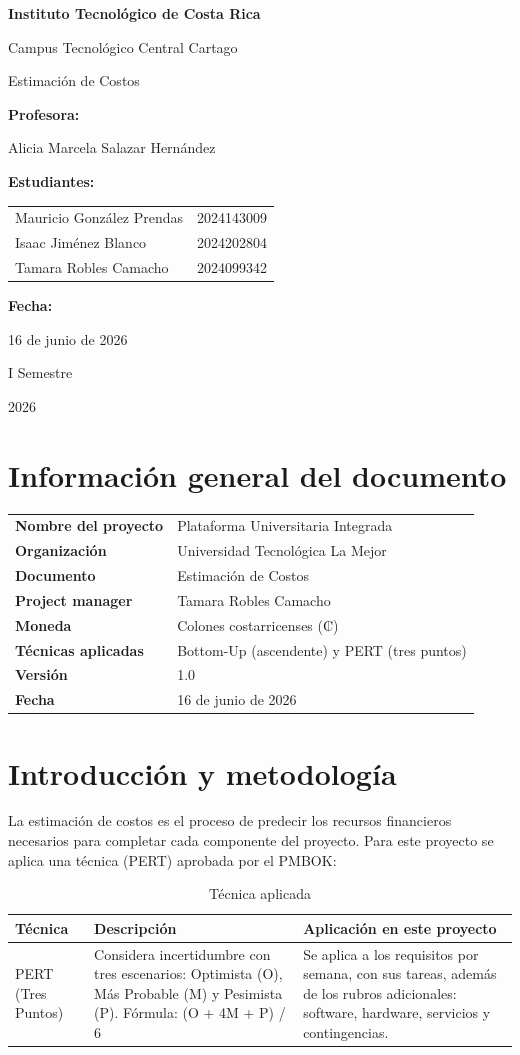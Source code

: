 \documentclass[11pt,spanish]{article}
\title{\DocumentoTitulo}
\author{\AutoresPortada}
\date{\FechaDocumento}
\makeatletter
\newcommand{\Institucion}{Instituto Tecnológico de Costa Rica}
\newcommand{\Campus}{Campus Tecnológico Central Cartago}
\newcommand{\DocumentoTitulo}{Estimación de Costos}
\newcommand{\Profesor}{Alicia Marcela Salazar Hernández}
\newcommand{\FechaDocumento}{16 de junio de 2026}
\newcommand{\PeriodoAcademico}{I Semestre}
\newcommand{\AnioDocumento}{2026}
\newcommand{\AutoresPortada}{%
    \begin{tabular}{l@{\hspace{1.5cm}}r}
        Mauricio González Prendas & 2024143009\\
        Isaac Jiménez Blanco & 2024202804\\
        Tamara Robles Camacho & 2024099342
    \end{tabular}%
}
\newcommand{\MakeCover}{%
\begin{titlepage}
\thispagestyle{empty}
\centering

{\bfseries \huge \Institucion \par}
\vspace{0.25cm}
{\LARGE \Campus \par}

\vfill

{\huge \DocumentoTitulo \par}

\vfill

{\bfseries \LARGE Profesora: \par}
{\Large \Profesor \par}

\vfill

{\bfseries \LARGE Estudiantes: \par}
{\Large \AutoresPortada \par}

\vfill

{\bfseries\LARGE Fecha: \par}
{\Large \FechaDocumento \par}

\vfill

{\LARGE \PeriodoAcademico \par}
{\LARGE \AnioDocumento \par}

\end{titlepage}%
}
\makeatother
\begin{document}
\hypersetup{pageanchor=false}

\MakeCover

\pagestyle{empty}
\tableofcontents
\clearpage
{}
\hypersetup{pageanchor=true}
\pagestyle{fancy}

\section{Información general del documento}

\begin{table}[H]
\centering
\begin{tabularx}{\textwidth}{p{5cm} Y}
\toprule
\textbf{Nombre del proyecto} & Plataforma Universitaria Integrada \\
\textbf{Organización} & Universidad Tecnológica La Mejor \\
\textbf{Documento} & \DocumentoTitulo \\
\textbf{Project manager} & Tamara Robles Camacho \\
\textbf{Moneda} & Colones costarricenses (₡) \\
\textbf{Técnicas aplicadas} & Bottom-Up (ascendente) y PERT (tres puntos) \\
\textbf{Versión} & 1.0 \\
\textbf{Fecha} & \FechaDocumento \\
\bottomrule
\end{tabularx}
\end{table}

\section{Introducción y metodología}

La estimación de costos es el proceso de predecir los recursos financieros necesarios para completar cada componente del proyecto. Para este proyecto se aplica una técnica (PERT) aprobada por el PMBOK:

\begin{table}[H]
\centering
\caption{Técnica aplicada}
\label{tab:tecnica-aplicada}
{\small
\begin{tabularx}{\textwidth}{P{3.8cm} Y Y}
\toprule
\textbf{Técnica} & \textbf{Descripción} & \textbf{Aplicación en este proyecto} \\
\midrule
PERT (Tres Puntos) & Considera incertidumbre con tres escenarios: Optimista (O), Más Probable (M) y Pesimista (P). Fórmula: (O + 4M + P) / 6 & Se aplica a los requisitos por semana, con sus tareas, además de los rubros adicionales: software, hardware, servicios y contingencias. \\
\bottomrule
\end{tabularx}
}
\end{table}
\end{document}
